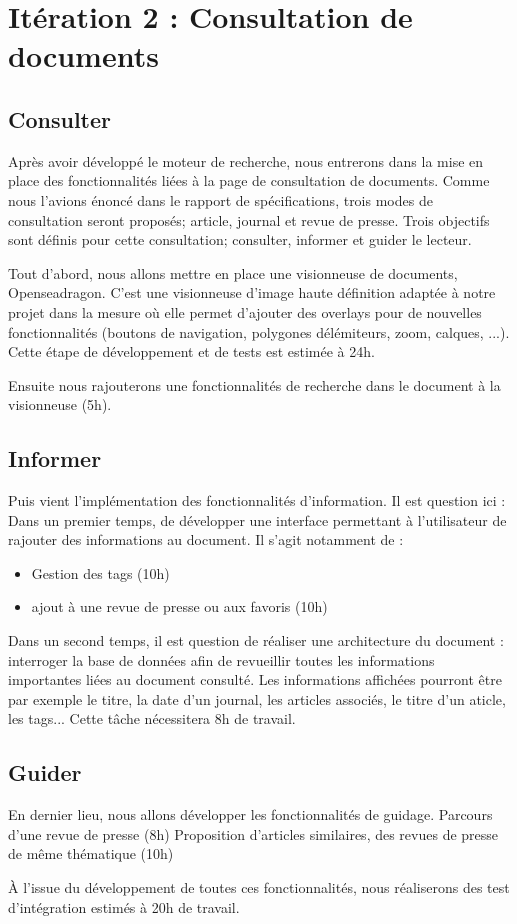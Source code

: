 \section{Itération 2 : Consultation de documents}

	\subsection{Consulter}
		Après avoir développé le moteur de recherche, nous entrerons dans la mise en place des fonctionnalités liées à la page de consultation de documents. Comme nous l'avions énoncé dans le rapport de spécifications, trois modes de consultation seront proposés; article, journal et revue de presse. Trois objectifs sont définis pour cette consultation; consulter, informer et guider le lecteur.


		Tout d'abord, nous allons mettre en place une visionneuse de documents, Openseadragon. C'est une visionneuse d'image haute définition adaptée à notre projet dans la mesure où elle permet d'ajouter des overlays pour de nouvelles fonctionnalités (boutons de navigation, polygones délémiteurs, zoom, calques, ...). Cette étape de développement et de tests est estimée à 24h.

		Ensuite nous rajouterons une fonctionnalités de recherche dans le document à la visionneuse (5h).

	\subsection{Informer}
		Puis vient l'implémentation des fonctionnalités d'information. Il est question ici :
		Dans un premier temps, de développer une interface permettant à l'utilisateur de rajouter des informations au document. Il s'agit notamment de :
			\begin{itemize}
			\item Gestion des tags (10h)
			\item ajout à une revue de presse ou aux favoris (10h)
			\end{itemize}

		Dans un second temps, il est question de réaliser une architecture du document : interroger la base de données afin de revueillir toutes les informations importantes liées au document consulté. Les informations affichées pourront être par exemple le titre, la date d'un journal, les articles associés, le titre d'un aticle, les tags... Cette tâche nécessitera 8h de travail.

	\subsection{Guider}
		En dernier lieu, nous allons développer les fonctionnalités de guidage.
		Parcours d'une revue de presse (8h)
		Proposition d'articles similaires, des revues de presse de même thématique (10h)

		À l'issue du développement de toutes ces fonctionnalités, nous réaliserons des test d'intégration estimés à 20h de travail.